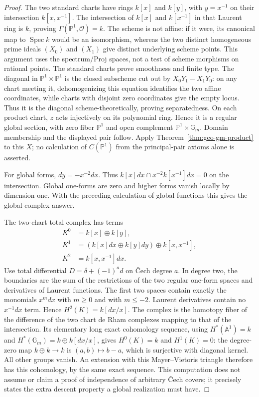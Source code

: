 \documentclass[11pt]{article}
\newcommand{\A}{\mathbb A}
\newcommand{\PP}{\mathbb P}
\newcommand{\Gm}{{\mathbb G_m}}
\newcommand{\Spec}{\operatorname{Spec}}
\theoremstyle{definition}
\theoremstyle{remark}
\newcommand{\OO}{\mathcal O}
\newcommand{\G}{\ensuremath{\Gamma}}
\renewcommand{\Spec}{\ensuremath{\operatorname{Spec}}}
\begin{document}
\begin{proof}
The two standard charts have rings $k[x]$ and $k[y]$, with $y=x^{-1}$ on their intersection $k[x,x^{-1}]$. The intersection of $k[x]$ and $k[x^{-1}]$ in that Laurent ring is $k$, proving $\G(\PP^1,\OO)=k$. The scheme is not affine: if it were, its canonical map to $\Spec k$ would be an isomorphism, whereas the two distinct homogeneous prime ideals $(X_0)$ and $(X_1)$ give distinct underlying scheme points. This argument uses the spectrum/Proj spaces, not a test of scheme morphisms on rational points. The standard charts prove smoothness and finite type. The diagonal in $\PP^1\times\PP^1$ is the closed subscheme cut out by $X_0Y_1-X_1Y_0$: on any chart meeting it, dehomogenizing this equation identifies the two affine coordinates, while charts with disjoint zero coordinates give the empty locus. Thus it is the diagonal scheme-theoretically, proving separatedness. On each product chart, $z$ acts injectively on its polynomial ring. Hence it is a regular global section, with zero fiber $\PP^1$ and open complement $\PP^1\times\Gm$. Domain membership and the displayed pair follow. Apply Theorem~\ref{thm:geo-gm-product} to this $X$; no calculation of $C(\PP^1)$ from the principal-pair axioms alone is asserted.

For global forms, $dy=-x^{-2}dx$. Thus
$k[x]dx\cap x^{-2}k[x^{-1}]dx=0$ on the intersection. Global one-forms are zero and higher forms vanish locally by dimension one. With the preceding calculation of global functions this gives the global-complex answer.

The two-chart total complex has terms
\[
 \begin{split}
 K^0&=k[x]\oplus k[y],\\
 K^1&=(k[x]dx\oplus k[y]dy)\oplus k[x,x^{-1}],\\
 K^2&=k[x,x^{-1}]dx.
 \end{split}
\]
Use total differential $D=\delta+(-1)^a d$ on \v{C}ech degree $a$. In degree two, the boundaries are the sum of the restrictions of the two regular one-form spaces and derivatives of Laurent functions. The first two spaces contain exactly the monomials $x^m dx$ with $m\geq0$ and with $m\leq-2$. Laurent derivatives contain no $x^{-1}dx$ term. Hence $H^2(K)=k[dx/x]$. The complex is the homotopy fiber of the difference of the two chart de Rham complexes mapping to that of the intersection. Its elementary long exact cohomology sequence, using $H^*(\A^1)=k$ and $H^*(\Gm)=k\oplus k[dx/x]$, gives $H^0(K)=k$ and $H^1(K)=0$: the degree-zero map $k\oplus k\to k$ is $(a,b)\mapsto b-a$, which is surjective with diagonal kernel. All other groups vanish. An extension with this Mayer--Vietoris triangle therefore has this cohomology, by the same exact sequence. This computation does not assume or claim a proof of independence of arbitrary \v{C}ech covers; it precisely states the extra descent property a global realization must have.
\end{proof}
\end{document}
